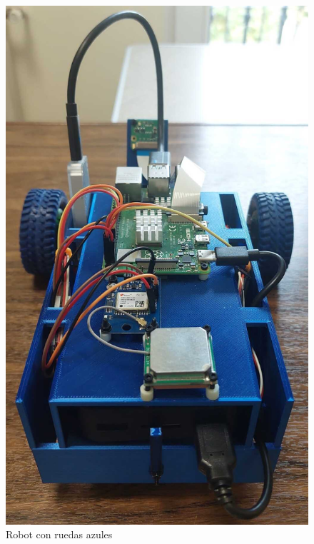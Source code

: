 \begin{figure}[ht!]
	\centering
	\begin{minipage}{0.31\linewidth}
		\centering
		\includegraphics[width=\linewidth]{figs/cap5/ra.jpeg}
		\caption*{\centering Robot con ruedas azules}
	\end{minipage}
	\hspace{2cm}
	\begin{minipage}{0.30\linewidth}
		\centering

\end{minipage}
\end{figure}

